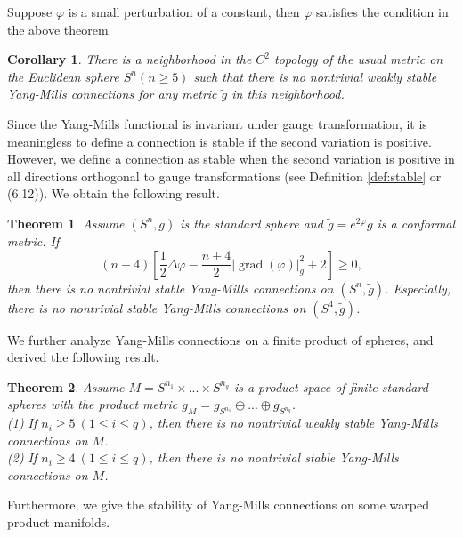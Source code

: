 \documentclass{amsart}
\newtheorem{theorem}{Theorem}[section]
\newtheorem{corollary}{Corollary}[section]
\begin{document}
	Suppose \(\varphi\) is a small perturbation of a constant, then $\varphi$ satisfies the condition in the above theorem.
	\begin{corollary}
		There is a neighborhood in the  $C^2$ topology of the usual metric on the
		Euclidean sphere $S^n (n\geq 5)$ such that there is no nontrivial weakly stable Yang-Mills connections for any metric $\tilde{g}$ in this neighborhood.
	\end{corollary}
	Since the Yang-Mills functional is invariant under gauge transformation, it is meaningless to define a connection is stable if the second variation is positive. However, we define a connection as stable when the second variation is positive in all directions orthogonal to gauge transformations (see Definition \ref{def:stable} or \cite{BL} (6.12)). We obtain the following result.
	\begin{theorem}\label{thm 2}
		Assume $(S^n,g)$ is the standard sphere and $\tilde g=e^{2\varphi}g$ is a conformal metric. If
		\begin{equation*}
			(n-4)\left[\frac{1}2\Delta\varphi-\frac{n+4}2|\operatorname{grad}(\varphi)|_g^2+2\right]\ge0,
		\end{equation*}
		then there is no nontrivial stable Yang-Mills connections on $(S^n,\tilde g)$. Especially, there is no nontrivial stable Yang-Mills connections on $(S^4,\tilde g)$.
	\end{theorem}
	We further analyze Yang-Mills connections on a finite product of spheres, and derived the following result.
	\begin{theorem}\label{thm:S^n times S^m}
		Assume $M=S^{n_1}\times...\times S^{n_q}$ is a product space of finite standard spheres with the product metric $g_M=g_{S^{n_1}}\oplus...\oplus g_{S^{n_q}}$.\\
		(1) If $n_i\ge5\ (1\le i\le q)$, then there is no nontrivial weakly stable Yang-Mills connections on $M$.\\
		(2) If $n_i\ge4\ (1\le i\le q)$, then there is no nontrivial stable Yang-Mills connections on $M$.
	\end{theorem}
	Furthermore, we give the stability of Yang-Mills connections on some warped product manifolds.
\end{document}
